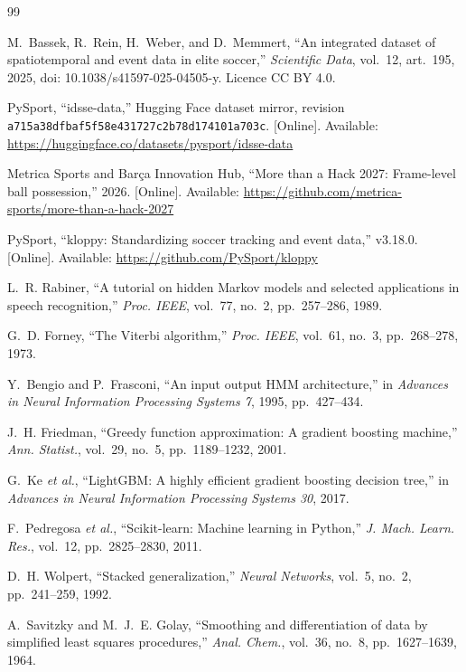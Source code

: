 \documentclass[journal]{IEEEtran}
\begin{document}
\begin{thebibliography}{99}

M.~Bassek, R.~Rein, H.~Weber, and D.~Memmert, ``An integrated dataset of spatiotemporal and event data in elite soccer,'' \textit{Scientific Data}, vol.~12, art.~195, 2025, doi: 10.1038/s41597-025-04505-y. Licence CC BY 4.0.

PySport, ``idsse-data,'' Hugging Face dataset mirror, revision \texttt{a715a38dfbaf5f58e431727c2b78d174101a703c}. [Online]. Available: \url{https://huggingface.co/datasets/pysport/idsse-data}

Metrica Sports and Barça Innovation Hub, ``More than a Hack 2027: Frame-level ball possession,'' 2026. [Online]. Available: \url{https://github.com/metrica-sports/more-than-a-hack-2027}

PySport, ``kloppy: Standardizing soccer tracking and event data,'' v3.18.0. [Online]. Available: \url{https://github.com/PySport/kloppy}

L.~R. Rabiner, ``A tutorial on hidden Markov models and selected applications in speech recognition,'' \textit{Proc. IEEE}, vol.~77, no.~2, pp.~257--286, 1989.

G.~D. Forney, ``The Viterbi algorithm,'' \textit{Proc. IEEE}, vol.~61, no.~3, pp.~268--278, 1973.

Y.~Bengio and P.~Frasconi, ``An input output HMM architecture,'' in \textit{Advances in Neural Information Processing Systems 7}, 1995, pp.~427--434.

J.~H. Friedman, ``Greedy function approximation: A gradient boosting machine,'' \textit{Ann. Statist.}, vol.~29, no.~5, pp.~1189--1232, 2001.

G.~Ke \textit{et al.}, ``LightGBM: A highly efficient gradient boosting decision tree,'' in \textit{Advances in Neural Information Processing Systems 30}, 2017.

F.~Pedregosa \textit{et al.}, ``Scikit-learn: Machine learning in Python,'' \textit{J. Mach. Learn. Res.}, vol.~12, pp.~2825--2830, 2011.

D.~H. Wolpert, ``Stacked generalization,'' \textit{Neural Networks}, vol.~5, no.~2, pp.~241--259, 1992.

A.~Savitzky and M.~J.~E. Golay, ``Smoothing and differentiation of data by simplified least squares procedures,'' \textit{Anal. Chem.}, vol.~36, no.~8, pp.~1627--1639, 1964.

\end{thebibliography}
\end{document}
